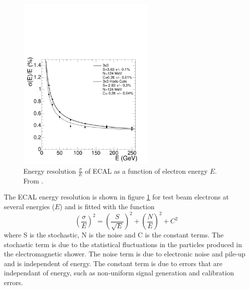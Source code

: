 \begin{figure}[htb!]
  \centering
  \includegraphics[width=0.6\textwidth]{ecal_performance}
  \caption{Energy resolution $\frac{\sigma}{E}$ of ECAL as a function of
  \label{fig:ECAL}
electron energy $E$. From \cite{cms}.}
\end{figure}

The ECAL energy resolution is shown in figure \ref{fig:ECAL} for test beam
electrons at several energies ($E$) and is fitted with the function
\begin{equation}
\left(\frac{\sigma}{E}\right)^{2} = \left(\frac{S}{\sqrt{E}}\right)^{2} +
\left(\frac{N}{E}\right)^{2} + C^{2}
\end{equation}
where S is the stochastic, N is the noise and C is the constant terms. The
stochastic term is due to the statistical fluctuations in the particles
produced in the electromagnetic shower. The noise term is due to electronic
noise and pile-up and is independent of energy. The constant term is due to
errors that are independant of energy, such as non-uniform signal generation
and calibration errors.\cite{cms}




